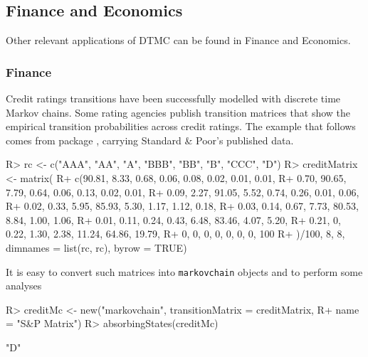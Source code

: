\documentclass[
  nojss]{jss}
\begin{document}
\hypertarget{app:fin}{%
\subsection{Finance and Economics}\label{app:fin}}

Other relevant applications of DTMC can be found in Finance and Economics.

\hypertarget{fin:fin}{%
\subsubsection{Finance}\label{fin:fin}}

Credit ratings transitions have been successfully modelled with discrete time Markov chains. Some rating agencies publish transition matrices that show the empirical transition probabilities across credit ratings. The example that follows
comes from   package \citep{CreditMetricsR},
carrying Standard \& Poor's published data.

\begin{CodeChunk}

\begin{CodeInput}
R> rc <- c("AAA", "AA", "A", "BBB", "BB", "B", "CCC", "D")
R> creditMatrix <- matrix(
R+   c(90.81, 8.33, 0.68, 0.06, 0.08, 0.02, 0.01, 0.01,
R+     0.70, 90.65, 7.79, 0.64, 0.06, 0.13, 0.02, 0.01,
R+     0.09, 2.27, 91.05, 5.52, 0.74, 0.26, 0.01, 0.06,
R+     0.02, 0.33, 5.95, 85.93, 5.30, 1.17, 1.12, 0.18,
R+     0.03, 0.14, 0.67, 7.73, 80.53, 8.84, 1.00, 1.06,
R+     0.01, 0.11, 0.24, 0.43, 6.48, 83.46, 4.07, 5.20,
R+     0.21, 0, 0.22, 1.30, 2.38, 11.24, 64.86, 19.79,
R+     0, 0, 0, 0, 0, 0, 0, 100
R+    )/100, 8, 8, dimnames = list(rc, rc), byrow = TRUE)
\end{CodeInput}
\end{CodeChunk}

It is easy to convert such matrices into \texttt{markovchain} objects and to perform some analyses

\begin{CodeChunk}

\begin{CodeInput}
R> creditMc <- new("markovchain", transitionMatrix = creditMatrix, 
R+                 name = "S&P Matrix")
R> absorbingStates(creditMc)
\end{CodeInput}

\begin{CodeOutput}
[1] "D"
\end{CodeOutput}
\end{CodeChunk}
\end{document}
